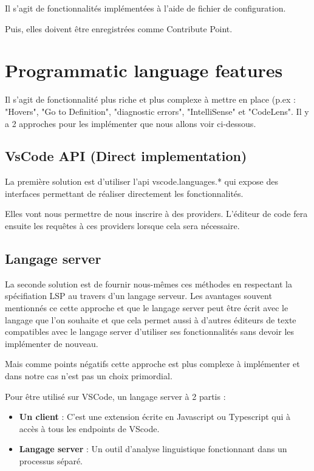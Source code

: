 \documentclass[
    iict, %
    il, %
]{heig-tb}
\begin{document}
Il s'agit de fonctionnalités implémentées à l'aide de fichier de configuration.

Puis, elles doivent être enregistrées comme Contribute Point.

\section{Programmatic language features}
Il s'agit de fonctionnalité plus riche et plus complexe à mettre en place (p.ex : "Hovers", "Go to Definition", "diagnostic errors", "IntelliSense" \space et "CodeLens".
Il y a 2 approches pour les implémenter que nous allons voir ci-dessous.

\subsection{VsCode API (Direct implementation)}
La première solution est d'utiliser l'api vscode.languages.* \cite{vscode-api-languages} qui expose des interfaces
permettant de réaliser directement les fonctionnalités.

Elles vont nous permettre de nous inscrire à des providers. L'éditeur de code fera ensuite les requêtes à ces providers lorsque cela sera nécessaire.

\subsection{Langage server}
La seconde solution est de fournir nous-mêmes ces méthodes en respectant la spécifiation LSP \cite{lsp-specification} au travers d'un langage serveur.
Les avantages souvent mentionnés ce cette approche et que le langage server peut être écrit avec le langage que l'on souhaite et
que cela permet aussi à d'autres éditeurs de texte compatibles avec le langage server d'utiliser ses fonctionnalités sans devoir les implémenter de nouveau.

Mais comme points négatifs cette approche est plus complexe à implémenter et dans notre cas n'est pas un choix primordial.

Pour être utilisé sur VSCode, un langage server à 2 partis :
\begin{itemize}
    \item \textbf{Un client} : C'est une extension écrite en Javascript ou Typescript qui à accès à tous les endpoints de VScode.
    \item \textbf{Langage server} : Un outil d'analyse linguistique fonctionnant dans un processus séparé.
\end{itemize}
\end{document}
